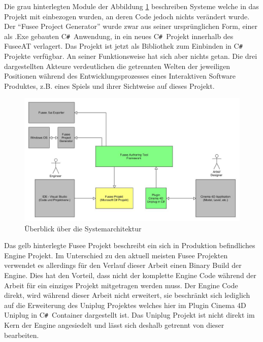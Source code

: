 \documentclass[pagesize, paper=a4, fontsize=12pt, titlepage=true, headings=small, headnosepline, abstractoff, liststotoc, nochapterprefix, plainheadsepline, twoside]{scrreprt}
\newcommand{\CSS}{C\texttt{\# }}
\begin{document}
Die grau hinterlegten Module der Abbildung \ref{FuseeATSystemÜberblick} beschreiben Systeme welche in das Projekt mit einbezogen wurden, an deren Code jedoch nichts verändert wurde. Der “Fusee Project Generator” wurde zwar aus seiner ursprünglichen Form, einer als .Exe gebauten \CSS Anwendung, in ein neues \CSS Projekt innerhalb des FuseeAT verlagert. Das Projekt ist jetzt als Bibliothek zum Einbinden in \CSS Projekte verfügbar. An seiner Funktionsweise hat sich aber nichts getan. Die drei dargestellten Akteure verdeutlichen die getrennten Welten der jeweiligen Positionen während des Entwicklungsprozesses eines Interaktiven Software Produktes, z.B. eines Spiels und ihrer Sichtweise auf dieses Projekt.
\begin{figure}[ht]
	\centering
	\includegraphics[width=\linewidth]{Bilder/Ueberblick_System.jpg}
	\caption{Überblick über die Systemarchitektur}
	\label{FuseeATSystemÜberblick}
\end{figure}
Das gelb hinterlegte Fusee Projekt beschreibt ein sich in Produktion befindliches Engine Projekt. Im Unterschied zu den aktuell meisten Fusee Projekten verwendet es allerdings für den Verlauf dieser Arbeit einen Binary Build der Engine. Dies hat den Vorteil, dass nicht der komplette Engine Code während der Arbeit für ein einziges Projekt mitgetragen werden muss. Der Engine Code direkt, wird während dieser Arbeit nicht erweitert, sie beschränkt sich lediglich auf die Erweiterung des Uniplug Projektes welches hier im Plugin Cinema 4D Uniplug in \CSS Container dargestellt ist. Das Uniplug Projekt ist nicht direkt im Kern der Engine angesiedelt und lässt sich deshalb getrennt von dieser bearbeiten.
\\
\\
\end{document}
